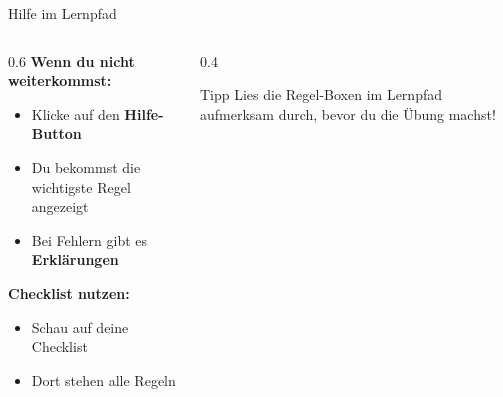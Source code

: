 \documentclass[aspectratio=169,11pt]{beamer}
\begin{document}

\begin{frame}{Hilfe im Lernpfad}

\begin{columns}
\begin{column}{0.6\textwidth}
\textbf{Wenn du nicht weiterkommst:}
\begin{itemize}
    \item Klicke auf den \textbf{Hilfe-Button}
    \item Du bekommst die wichtigste Regel angezeigt
    \item Bei Fehlern gibt es \textbf{Erklärungen}
\end{itemize}

\vspace{5mm}

\textbf{Checklist nutzen:}
\begin{itemize}
    \item Schau auf deine Checklist
    \item Dort stehen alle Regeln
\end{itemize}
\end{column}

\begin{column}{0.4\textwidth}
\begin{block}{Tipp}
Lies die Regel-Boxen im Lernpfad aufmerksam durch, bevor du die Übung machst!
\end{block}
\end{column}
\end{columns}

\end{frame}

\end{document}

